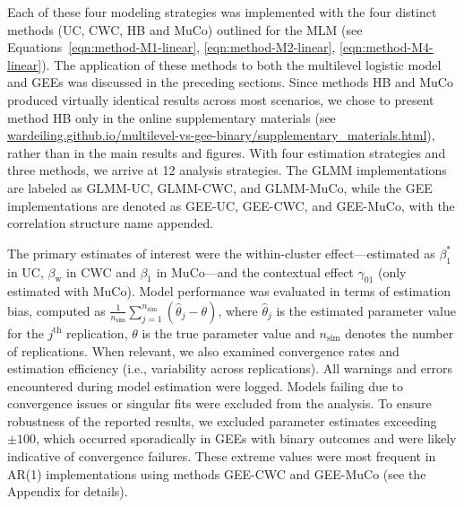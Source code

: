 \documentclass[stu]{apa7}
\begin{document}
Each of these four modeling strategies was implemented with the four distinct methods (UC, CWC, HB and MuCo) outlined for the MLM (see Equations~\ref{eqn:method-M1-linear}, \ref{eqn:method-M2-linear}, \ref{eqn:method-M4-linear}). The application of these methods to both the multilevel logistic model and GEEs was discussed in the preceding sections. Since methods HB and MuCo produced virtually identical results across most scenarios, we chose to present method HB only in the online supplementary materials (see \href{https://wardeiling.github.io/multilevel-vs-gee-binary/supplementary_materials.html}{wardeiling.github.io/multilevel-vs-gee-binary/supplementary\_materials.html}), rather than in the main results and figures. With four estimation strategies and three methods, we arrive at 12 analysis strategies. The GLMM implementations are labeled as GLMM-UC, GLMM-CWC, and GLMM-MuCo, while the GEE implementations are denoted as GEE-UC, GEE-CWC, and GEE-MuCo, with the correlation structure name appended.


The primary estimates of interest were the within-cluster effect---estimated as $\beta_1^*$ in UC, $\beta_\text{w}$ in CWC and $\beta_1$ in MuCo---and the contextual effect \( \gamma_{01} \) (only estimated with MuCo). Model performance was evaluated in terms of estimation bias, computed as $\frac{1}{n_{\text{sim}}} \sum\limits_{j=1}^{n_{\text{sim}}} \left( \hat{\theta}_j - \theta \right)$, where \( \hat{\theta}_j \) is the estimated parameter value for the $j^\text{th}$ replication, \( \theta \) is the true parameter value and $n_\text{sim}$ denotes the number of replications. When relevant, we also examined convergence rates and estimation efficiency (i.e., variability across replications). All warnings and errors encountered during model estimation were logged. Models failing due to convergence issues or singular fits were excluded from the analysis. To ensure robustness of the reported results, we excluded parameter estimates exceeding $\pm 100$, which occurred sporadically in GEEs with binary outcomes and were likely indicative of convergence failures. These extreme values were most frequent in AR(1) implementations using methods GEE-CWC and GEE-MuCo (see the Appendix for details). 
\end{document}
